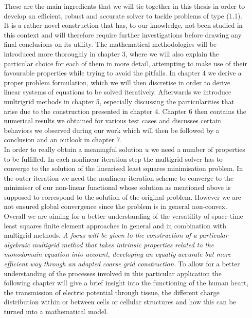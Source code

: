 \documentclass[../draft_1.tex]{subfiles}
\begin{document}
These are the main ingredients that we will tie together in this thesis in order to develop an efficient, robust and accurate solver to tackle problems of type (1.1). It is a rather novel construction that has, to our knowledge, not been studied in this context and will therefore require further investigations before drawing any final conclusions on its utility. The mathematical methodologies will be introduced more thoroughly in chapter 3, where we will also explain the particular choice for each of them in more detail, attempting to make use of their favourable properties while trying to avoid the pitfalls. In chapter 4 we derive a proper problem formulation, which we will then discretise in order to derive linear systems of equations to be solved iteratively. Afterwards we introduce multrigrid methods in chapter 5, especially discussing the particularities that arise due to the construction presented in chapter 4. Chapter 6 then contains the numerical results we obtained for various test cases and discusses certain behaviors we observed during our work which will then be followed by a conclusion and an outlook in chapter 7. 
\bigskip
\\ 
In order to really obtain a meaningful solution $u$ we need a number of properties to be fulfilled. In each nonlinear iteration step the multigrid solver has to converge to the solution of the linearised least squares minimisation problem. In the outer iteration we need the nonlinear iteration scheme to converge to the minimiser of our non-linear functional whose solution as mentioned above is supposed to correspond to the solution of the original problem. However we are not ensured global convergence since the problem is in general non-convex. 
\bigskip
\\
Overall we are aiming for a better understanding of the versatility of space-time least squares finite element approaches in general and in combination with multigrid methods. \textit{A focus will be given to the construction of a particular algebraic multigrid method that takes intrinsic properties related to the monodomain equation into account, developing an equally accurate but more efficient way through an adapted coarse grid construction.} To allow for a better understanding of the processes involved in this particular application the following chapter will give a brief insight into the functioning of the human heart, the transmission of electric potential through tissue, the different charge distribution within or between cells or cellular structures and how this can be turned into a mathematical model. 
\end{document}
